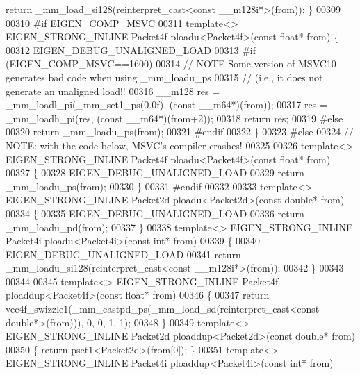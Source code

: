\begin{DoxyCode}
{      return} \_mm\_load\_si128(reinterpret\_cast<const \_\_m128i*>(from)); \}
00309 
00310 \textcolor{preprocessor}{#if EIGEN\_COMP\_MSVC}
00311   \textcolor{keyword}{template}<> EIGEN\_STRONG\_INLINE Packet4f ploadu<Packet4f>(\textcolor{keyword}{const} \textcolor{keywordtype}{float}*  from) \{
00312     EIGEN\_DEBUG\_UNALIGNED\_LOAD
00313 \textcolor{preprocessor}{    #if (EIGEN\_COMP\_MSVC==1600)}
00314     \textcolor{comment}{// NOTE Some version of MSVC10 generates bad code when using \_mm\_loadu\_ps}
00315     \textcolor{comment}{// (i.e., it does not generate an unaligned load!!}
00316     \_\_m128 res = \_mm\_loadl\_pi(\_mm\_set1\_ps(0.0f), (\textcolor{keyword}{const} \_\_m64*)(from));
00317     res = \_mm\_loadh\_pi(res, (\textcolor{keyword}{const} \_\_m64*)(from+2));
00318     \textcolor{keywordflow}{return} res;
00319 \textcolor{preprocessor}{    #else}
00320     \textcolor{keywordflow}{return} \_mm\_loadu\_ps(from);
00321 \textcolor{preprocessor}{    #endif}
00322   \}
00323 \textcolor{preprocessor}{#else}
00324 \textcolor{comment}{// NOTE: with the code below, MSVC's compiler crashes!}
00325 
00326 \textcolor{keyword}{template}<> EIGEN\_STRONG\_INLINE Packet4f ploadu<Packet4f>(\textcolor{keyword}{const} \textcolor{keywordtype}{float}* from)
00327 \{
00328   EIGEN\_DEBUG\_UNALIGNED\_LOAD
00329   \textcolor{keywordflow}{return} \_mm\_loadu\_ps(from);
00330 \}
00331 \textcolor{preprocessor}{#endif}
00332 
00333 \textcolor{keyword}{template}<> EIGEN\_STRONG\_INLINE Packet2d ploadu<Packet2d>(\textcolor{keyword}{const} \textcolor{keywordtype}{double}* from)
00334 \{
00335   EIGEN\_DEBUG\_UNALIGNED\_LOAD
00336   \textcolor{keywordflow}{return} \_mm\_loadu\_pd(from);
00337 \}
00338 \textcolor{keyword}{template}<> EIGEN\_STRONG\_INLINE Packet4i ploadu<Packet4i>(\textcolor{keyword}{const} \textcolor{keywordtype}{int}* from)
00339 \{
00340   EIGEN\_DEBUG\_UNALIGNED\_LOAD
00341   \textcolor{keywordflow}{return} \_mm\_loadu\_si128(reinterpret\_cast<const \_\_m128i*>(from));
00342 \}
00343 
00344 
00345 \textcolor{keyword}{template}<> EIGEN\_STRONG\_INLINE Packet4f ploaddup<Packet4f>(\textcolor{keyword}{const} \textcolor{keywordtype}{float}*   from)
00346 \{
00347   \textcolor{keywordflow}{return} vec4f\_swizzle1(\_mm\_castpd\_ps(\_mm\_load\_sd(reinterpret\_cast<const double*>(from))), 0, 0, 1, 1);
00348 \}
00349 \textcolor{keyword}{template}<> EIGEN\_STRONG\_INLINE Packet2d ploaddup<Packet2d>(\textcolor{keyword}{const} \textcolor{keywordtype}{double}*  from)
00350 \{ \textcolor{keywordflow}{return} pset1<Packet2d>(from[0]); \}
00351 \textcolor{keyword}{template}<> EIGEN\_STRONG\_INLINE Packet4i ploaddup<Packet4i>(\textcolor{keyword}{const} \textcolor{keywordtype}{int}*     from)

\end{DoxyCode}
